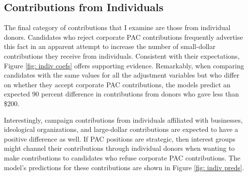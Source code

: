 \documentclass[12pt]{article}
\begin{document}
\subsection{Contributions from Individuals}

The final category of contributions that I examine are those from individual donors. Candidates who reject corporate PAC contributions frequently advertise this fact in an apparent attempt to increase the number of small-dollar contributions they receive from individuals. Consistent with their expectations, Figure \ref{fig: indiv coefs} offers supporting evidence. Remarkably, when comparing candidates with the same values for all the adjustment variables but who differ on whether they accept corporate PAC contributions, the models predict an expected 90 percent difference in contributions from donors who gave less than \$200. 

Interestingly, campaign contributions from individuals affiliated with businesses, ideological organizations, and large-dollar contributions are expected to have a positive difference as well. If PAC positions are strategic, then interest groups might channel their contributions through individual donors when wanting to make contributions to candidates who refuse corporate PAC contributions. The model's predictions for these contributions are shown in Figure \ref{fig: indiv preds}. 
\end{document}
